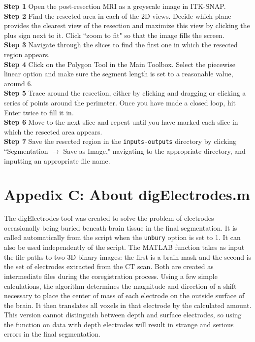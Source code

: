 \documentclass[12pt]{article}
\begin{document}
\textbf{Step 1} Open the post-resection MRI as a greyscale image in ITK-SNAP. \\
\textbf{Step 2} Find the resected area in each of the 2D views. Decide which plane provides the clearest view of the resection and maximize this view by clicking the plus sign next to it. Click ``zoom to fit" so that the image fills the screen.\\
\textbf{Step 3} Navigate through the slices to find the first one in which the resected region appears. \\
\textbf{Step 4} Click on the Polygon Tool in the Main Toolbox. Select the piecewise linear option and make sure the segment length is set to a reasonable value, around 6. \\
\textbf{Step 5} Trace around the resection, either by clicking and dragging or clicking a series of points around the perimeter. Once you have made a closed loop, hit Enter twice to fill it in. \\
\textbf{Step 6} Move to the next slice and repeat until you have marked each slice in which the resected area appears. \\
\textbf{Step 7} Save the resected region in the \texttt{inputs-outputs} directory by clicking ``Segmentation $\rightarrow$ Save as Image," navigating to the appropriate directory, and inputting an appropriate file name. \\

\section*{Appedix C: About digElectrodes.m}
The digElectrodes tool was created to solve the problem of electrodes occasionally being buried beneath brain tissue in the final segmentation. It is called automatically from the script when the \texttt{unbury} option is set to 1. It can also be used independently of the script. The MATLAB function takes as input the file paths to two 3D binary images: the first is a brain mask and the second is the set of electrodes extracted from the CT scan. Both are created as intermediate files during the coregistration process. Using a few simple calculations, the algorithm determines the magnitude and direction of a shift necessary to place the center of mass of each electrode on the outside surface of the brain. It then translates all voxels in that electrode by the calculated amount. This version cannot distinguish between depth and surface electrodes, so using the function on data with depth electrodes will result in strange and serious errors in the final segmentation. 
\end{document}
